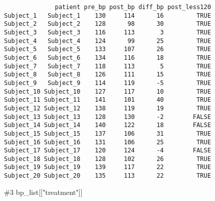 \documentclass[
  letterpaper,
  DIV=11,
  numbers=noendperiod]{scrartcl}
\newenvironment{Shaded}{\begin{snugshade}}{\end{snugshade}}
\newcommand{\CommentTok}[1]{\textcolor[rgb]{0.37,0.37,0.37}{#1}}
\newcommand{\NormalTok}[1]{\textcolor[rgb]{0.00,0.23,0.31}{#1}}
\newcommand{\SpecialCharTok}[1]{\textcolor[rgb]{0.37,0.37,0.37}{#1}}
\newcommand{\StringTok}[1]{\textcolor[rgb]{0.13,0.47,0.30}{#1}}
\begin{document}
\begin{Shaded}
\end{Shaded}

\begin{verbatim}
              patient pre_bp post_bp diff_bp post_less120
Subject_1   Subject_1    130     114      16         TRUE
Subject_2   Subject_2    128      98      30         TRUE
Subject_3   Subject_3    116     113       3         TRUE
Subject_4   Subject_4    124      99      25         TRUE
Subject_5   Subject_5    133     107      26         TRUE
Subject_6   Subject_6    134     116      18         TRUE
Subject_7   Subject_7    118     113       5         TRUE
Subject_8   Subject_8    126     111      15         TRUE
Subject_9   Subject_9    114     119      -5         TRUE
Subject_10 Subject_10    127     117      10         TRUE
Subject_11 Subject_11    141     101      40         TRUE
Subject_12 Subject_12    138     119      19         TRUE
Subject_13 Subject_13    128     130      -2        FALSE
Subject_14 Subject_14    140     122      18        FALSE
Subject_15 Subject_15    137     106      31         TRUE
Subject_16 Subject_16    131     106      25         TRUE
Subject_17 Subject_17    120     124      -4        FALSE
Subject_18 Subject_18    128     102      26         TRUE
Subject_19 Subject_19    139     117      22         TRUE
Subject_20 Subject_20    135     113      22         TRUE
\end{verbatim}

\begin{Shaded}
\begin{Highlighting}[]
\CommentTok{\#3}
\NormalTok{bp\_list[[}\StringTok{"treatment"}\NormalTok{]]}
\end{Highlighting}
\end{Shaded}
\end{document}
